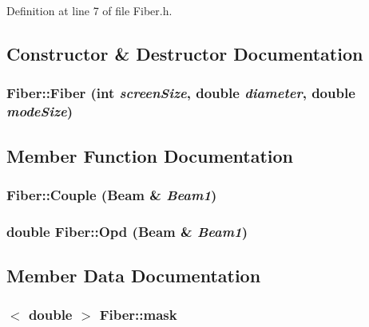 Definition at line 7 of file Fiber.h.



\subsection{Constructor \& Destructor Documentation}
\hypertarget{classFiber_a2ff0d3eb99b7370701ab14269c748d6d}{
\subsubsection[{Fiber}]{\setlength{\rightskip}{0pt plus 5cm}Fiber::Fiber (int {\em screenSize}, \/  double {\em diameter}, \/  double {\em modeSize})}}
\label{classFiber_a2ff0d3eb99b7370701ab14269c748d6d}


\subsection{Member Function Documentation}
\hypertarget{classFiber_a110c2c9c3af86fe6f819a311818792d5}{
\subsubsection[{Couple}]{ Fiber::Couple ({\bf Beam} \& {\em Beam1})}}
\label{classFiber_a110c2c9c3af86fe6f819a311818792d5}
\hypertarget{classFiber_a84c255aae041b642059f71f013f08c7a}{
\subsubsection[{Opd}]{\setlength{\rightskip}{0pt plus 5cm}double Fiber::Opd ({\bf Beam} \& {\em Beam1})}}
\label{classFiber_a84c255aae041b642059f71f013f08c7a}


\subsection{Member Data Documentation}
\hypertarget{classFiber_a359261e31720929aa841bbd663c0aa97}{
\subsubsection[{mask}]{$<$ double $>$ {\bf Fiber::mask}}}
\label{classFiber_a359261e31720929aa841bbd663c0aa97}


